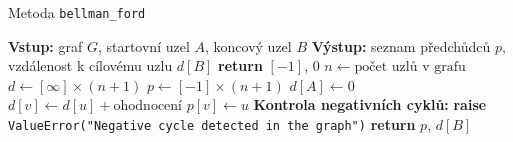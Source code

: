 \newpage

\begin{algorithm}
    \caption{Metoda \texttt{bellman\_ford}}
    \begin{algorithmic}[1]
        \STATE \textbf{Vstup:} graf $G$, startovní uzel $A$, koncový uzel $B$
        \STATE \textbf{Výstup:} seznam předchůdců $p$, vzdálenost k cílovému uzlu $d[B]$
            \STATE \textbf{return} $[-1]$, 0 
        \ENDIF
        \STATE $n \gets \text{počet uzlů v grafu}$ 
        \STATE $d \gets [\infty] \times (n+1)$ 
        \STATE $p \gets [-1] \times (n+1)$ 
        \STATE $d[A] \gets 0$
                        \STATE $d[v] \gets d[u] + \text{ohodnocení}$
                        \STATE $p[v] \gets u$
                    \ENDIF
                \ENDFOR
            \ENDFOR
        \ENDFOR
        \STATE \textbf{Kontrola negativních cyklů:}
                    \STATE \textbf{raise} \texttt{ValueError("Negative cycle detected in the graph")}
                \ENDIF
            \ENDFOR
        \ENDFOR
        \STATE \textbf{return} $p$, $d[B]$
    \end{algorithmic}
\end{algorithm}
